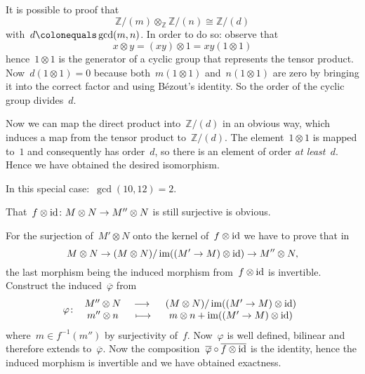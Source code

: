 \begin{exercise}
  It is possible to proof that
  \begin{equation}
    \mathbb{Z}/(m)\otimes_\mathbb{Z}\mathbb{Z}/(n)\cong\mathbb{Z}/(d)
  \end{equation}
  with~$d\colonequals\gcd(m,n)$. In order to do so: observe that
  \begin{equation}
    x\otimes y=\left( xy \right)\otimes 1=xy\left( 1\otimes 1 \right)
  \end{equation}
  hence~$1\otimes 1$ is the generator of a cyclic group that represents the tensor product. Now~$d(1\otimes 1)=0$ because both~$m(1\otimes 1)$ and~$n(1\otimes 1)$ are zero by bringing it into the correct factor and using B\'ezout's identity. So the order of the cyclic group divides~$d$.
  
  Now we can map the direct product into~$\mathbb{Z}/(d)$ in an obvious way, which induces a map from the tensor product to~$\mathbb{Z}/(d)$. The element~$1\otimes 1$ is mapped to~$1$ and consequently has order~$d$, so there is an element of order \emph{at least~$d$}. Hence we have obtained the desired isomorphism.

  In this special case:~$\gcd(10,12)=2$.
\end{exercise}

\begin{exercise} %
  \label{exercise:23h}
  That~$f\otimes\mathrm{id}\colon M\otimes N\to M''\otimes N$ is still surjective is obvious.

  For the surjection of~$M'\otimes N$ onto the kernel of~$f\otimes\mathrm{id}$ we have to prove that in
  \begin{equation}
    M\otimes N\to (M\otimes N)/\operatorname{im}((M'\to M)\otimes\mathrm{id})\to M''\otimes N,
  \end{equation}
  the last morphism being the induced morphism from~$f\otimes\mathrm{id}$ is invertible. Construct the induced~$\overline{\varphi}$ from
  \begin{equation}
    \map{\varphi}{M''\otimes N}{(M\otimes N)/\image((M'\to M)\otimes\identity)}{m''\otimes n}{m\otimes n+\image((M'\to M)\otimes\identity)}
  \end{equation}
  where~$m\in f^{-1}(m'')$ by surjectivity of~$f$. Now~$\varphi$ is well defined, bilinear and therefore extends to~$\overline{\varphi}$. Now the composition~$\overline{\varphi}\circ\overline{f\otimes\mathrm{id}}$ is the identity, hence the induced morphism is invertible and we have obtained exactness.
\end{exercise}

